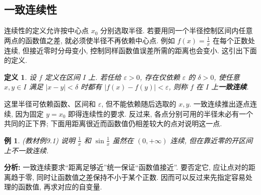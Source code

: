 \documentclass[UTF8,openany]{ctexbook}
\theoremstyle{chinesetextbook}
\newtheorem{example}{例}[section]
\newtheorem*{definitionsingle}{定义}
\begin{document}
\subsection{一致连续性}
连续性的定义允许按中心点 $x_0$ 分别选取半径. 若要用同一个半径控制区间内任意两点的函数值之差, 就必须使半径不再依赖中心点. 例如 $\displaystyle f(x)=\frac1x$ 在每个正数处连续, 但接近零时分母变小, 控制同样函数值误差所需的距离也会变小. 这引出下面的定义.
\begin{definitionsingle}
设 $f$ 定义在区间 $I$ 上. 若任给 $\varepsilon>0$, 存在仅依赖 $\varepsilon$ 的 $\delta>0$, 使任意 $x,y\in I$ 满足 $|x-y|<\delta$ 时都有 $|f(x)-f(y)|<\varepsilon$, 则称 $f$ 在 $I$ 上\textbf{一致连续}.
\end{definitionsingle}
这里半径可依赖函数、区间和 $\varepsilon$, 但不能依赖随后选取的 $x,y$. 一致连续推出逐点连续, 因为固定 $y=x_0$ 即得连续性的要求. 反过来, 各点分别可用的半径未必有一个共同的正下界; 下面用距离很近而函数值仍相差较大的点对说明这一点.
\begin{example}
(教材例9.1) 说明 $\displaystyle \frac1x$ 和 $\displaystyle \sin\frac1x$ 虽然在 $(0,+\infty)$ 连续, 但在靠近零的开区间上不一致连续.
\end{example}
\par\indent\textbf{分析:} 一致连续要求“距离足够近”统一保证“函数值接近”. 要否定它, 应让点对的距离趋于零, 同时让函数值之差保持不小于某个正数. 因而可以反过来先指定容易处理的函数值, 再求对应的自变量.
\end{document}
